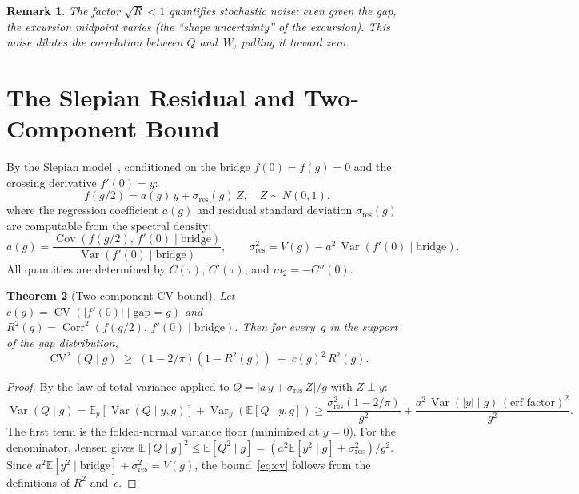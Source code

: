 \documentclass[11pt]{article}
\newtheorem{theorem}{Theorem}
\newtheorem{remark}[theorem]{Remark}
\DeclareMathOperator{\Corr}{Corr}
\DeclareMathOperator{\Cov}{Cov}
\DeclareMathOperator{\Var}{Var}
\DeclareMathOperator{\CV}{CV}
\begin{document}
\begin{remark}
The factor $\sqrt{R} < 1$ quantifies stochastic noise: even given the gap,
the excursion midpoint varies (the ``shape uncertainty'' of the excursion).
This noise \emph{dilutes} the correlation between $Q$ and~$W$, pulling it
toward zero.
\end{remark}


\section{The Slepian Residual and Two-Component Bound}\label{sec:slepian}

By the Slepian model~\cite{Lindgren2019}, conditioned on the bridge
$f(0) = f(g) = 0$ and the crossing derivative $f'(0) = y$:
\begin{equation}\label{eq:slepian}
f(g/2) = a(g)\,y + \sigma_{\mathrm{res}}(g)\,Z, \quad Z \sim N(0,1),
\end{equation}
where the regression coefficient $a(g)$ and residual standard deviation
$\sigma_{\mathrm{res}}(g)$ are computable from the spectral density:
\[
a(g) = \frac{\Cov(f(g/2),\, f'(0) \mid \mathrm{bridge})}
            {\Var(f'(0) \mid \mathrm{bridge})},
\qquad
\sigma_{\mathrm{res}}^2 = V(g) - a^2\,\Var(f'(0) \mid \mathrm{bridge}).
\]
All quantities are determined by $C(\tau)$, $C'(\tau)$, and $m_2 = -C''(0)$.

\begin{theorem}[Two-component CV bound]\label{thm:cv}
Let $c(g) = \CV(|f'(0)| \mid \mathrm{gap} = g)$ and
$R^2(g) = \Corr^2(f(g/2),\, f'(0) \mid \mathrm{bridge})$.
Then for every~$g$ in the support of the gap distribution,
\begin{equation}\label{eq:cv}
\CV^2(Q \mid g) \;\geq\;
(1{-}2/\pi)(1{-}R^2(g)) \;+\; c(g)^2\,R^2(g).
\end{equation}
\end{theorem}

\begin{proof}
By the law of total variance applied to $Q = |a\,y + \sigma_{\mathrm{res}}\,Z|/g$
with $Z \perp y$:
\[
\Var(Q \mid g)
= \mathbb{E}_y[\Var(Q \mid y, g)]
+ \Var_y(\mathbb{E}[Q \mid y, g])
\geq \frac{\sigma_{\mathrm{res}}^2(1{-}2/\pi)}{g^2}
+ \frac{a^2\,\Var(|y| \mid g)\,(\text{erf factor})^2}{g^2}.
\]
The first term is the folded-normal variance floor (minimized at $y{=}0$).
For the denominator, Jensen gives
$\mathbb{E}[Q \mid g]^2 \leq \mathbb{E}[Q^2 \mid g]
= (a^2\mathbb{E}[y^2 \mid g] + \sigma_{\mathrm{res}}^2)/g^2$.
Since $a^2\mathbb{E}[y^2 \mid \text{bridge}] + \sigma_{\mathrm{res}}^2 = V(g)$,
the bound~\eqref{eq:cv} follows from the definitions of $R^2$ and~$c$.
\end{proof}
\end{document}
